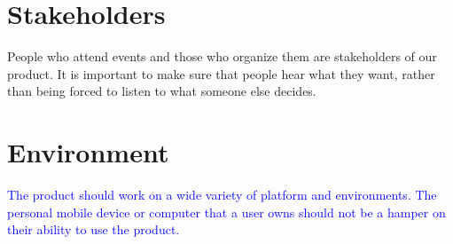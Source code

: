 \documentclass[11pt,fleqn]{article}
\begin{document}
\section{Stakeholders}
People who attend events and those who organize them are stakeholders of
our product. It is important to make sure that people hear what they want,
rather than being forced to listen to what someone else decides.

\section{Environment}
\textcolor{blue} {
The product should work on a wide variety of platform and environments. The personal mobile device or computer that a user owns should not be a hamper on their ability to use the product.
}
\end{document}
